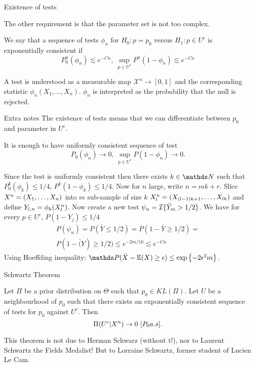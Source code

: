 \begin{frame}{Existence of tests}

The other requirement is that the parameter set is not too complex.   

\begin{definition}
We say that a sequence of tests $\phi_n$ for $H_0: p = p_0$ versus $H_1: p \in U^c$ is exponentially consistent if 
$$
P_0^n(\phi_n) \lesssim e^{-Cn}, ~ \sup_{p\in U^c} P^n(1-\phi_n) \lesssim e^{-Cn} 
$$
\end{definition}
A test is understood as a measurable map $\mathcal{X}^n \to [0,1]$ and the corresponding statistic $\phi_n(X_1, \dots, X_n)$. $\phi_n$ is interpreted as the probability that the null is rejected. 
\end{frame}


\begin{frame}[allowframebreaks]{Extra notes}
	The existence of tests means that we can differentiate between $p_0$ and parameter in $U^c$. 

	It is enough to have uniformly consistent sequence of test 
	$$
P_0(\phi_n) \to 0, ~ \sup_{p\in U^c} P(1-\phi_n) \to 0. 
	$$

Since the test is uniformly consistent then there exists $k\in \N$ such that $P_0^k(\phi_k) \leq 1/4$, $P^k(1-\phi_k) \leq 1/4$. Now for $n$ large, write $n = mk+r$. Slice $X^n = (X_1, \dots, X_n)$ into $m$ sub-sample of size $k$ $X^n_l = (X_{(l-1)k+1},\dots, X_{lk})$ and define $Y_{l,n} = \phi_k(X^n_l)$. Now create a new test $\psi_n = \mathcal{I}\{\bar{Y}_m > 1/2\}$. We have for every $p \in U^c$, $P(1-Y_j) \leq 1/4$
\begin{multline*}
P(\psi_n) = P(\bar{Y} \leq 1/2) = P(1-\bar{Y} \geq 1/2) = \\ 
P(1-\bar(Y) \geq 1/2) \leq e^{-2m/16} \lesssim e^{-Cn}
\end{multline*}
Using Hoeffding inequality: $\P(\bar{X} - \E(X) \geq \epsilon ) \leq \exp\left\{ - 2 \epsilon^2 m \right\}$.
\end{frame}



\begin{frame}{Schwartz Theorem}
\begin{theorem}
Let $\Pi$ be a prior distribution on $\Theta$ such that $p_0\in KL(\Pi)$. Let $U$ be a neighbourhood of $p_0$ such that there exists an exponentially consistent sequence of tests for $p_0$ against $U^c$. Then 
$$
\Pi(U^c | X^n) \to 0 ~ [P_0 a.s].
$$
\end{theorem}\pause

This theorem is not due to Herman Schwarz (without t!), nor to Laurent Schwartz the Fields Medalist! But to Lorraine Schwartz, former student of Lucien Le Cam.
\end{frame}


